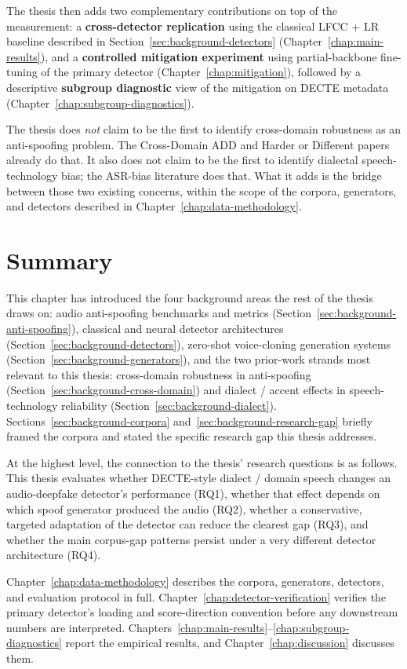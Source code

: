The thesis then adds two complementary contributions on top of
the measurement: a \textbf{cross-detector replication} using the
classical LFCC + LR baseline described in
Section~\ref{sec:background-detectors} (Chapter~\ref{chap:main-results}),
and a \textbf{controlled mitigation experiment} using
partial-backbone fine-tuning of the primary detector
(Chapter~\ref{chap:mitigation}), followed by a descriptive
\textbf{subgroup diagnostic} view of the mitigation on DECTE
metadata (Chapter~\ref{chap:subgroup-diagnostics}).

The thesis does \emph{not} claim to be the first to identify
cross-domain robustness as an anti-spoofing problem. The
Cross-Domain ADD and Harder or Different papers already do that.
It also does not claim to be the first to identify dialectal
speech-technology bias; the ASR-bias literature does that. What
it adds is the bridge between those two existing concerns, within
the scope of the corpora, generators, and detectors described in
Chapter~\ref{chap:data-methodology}.


\section{Summary}
\label{sec:background-summary}

This chapter has introduced the four background areas the rest of
the thesis draws on: audio anti-spoofing benchmarks and metrics
(Section~\ref{sec:background-anti-spoofing}), classical and
neural detector architectures (Section~\ref{sec:background-detectors}),
zero-shot voice-cloning generation systems
(Section~\ref{sec:background-generators}), and the two prior-work
strands most relevant to this thesis: cross-domain robustness in
anti-spoofing (Section~\ref{sec:background-cross-domain}) and
dialect / accent effects in speech-technology reliability
(Section~\ref{sec:background-dialect}).
Sections~\ref{sec:background-corpora} and~\ref{sec:background-research-gap}
briefly framed the corpora and stated the specific research gap
this thesis addresses.

At the highest level, the connection to the thesis' research
questions is as follows. This thesis evaluates whether
DECTE-style dialect / domain speech changes an audio-deepfake
detector's performance (RQ1), whether that effect depends on
which spoof generator produced the audio (RQ2), whether a
conservative, targeted adaptation of the detector can reduce the
clearest gap (RQ3), and whether the main corpus-gap patterns
persist under a very different detector architecture (RQ4).

Chapter~\ref{chap:data-methodology} describes the corpora,
generators, detectors, and evaluation protocol in full.
Chapter~\ref{chap:detector-verification} verifies the primary
detector's loading and score-direction convention before any
downstream numbers are interpreted. Chapters~\ref{chap:main-results}--\ref{chap:subgroup-diagnostics}
report the empirical results, and Chapter~\ref{chap:discussion}
discusses them.

